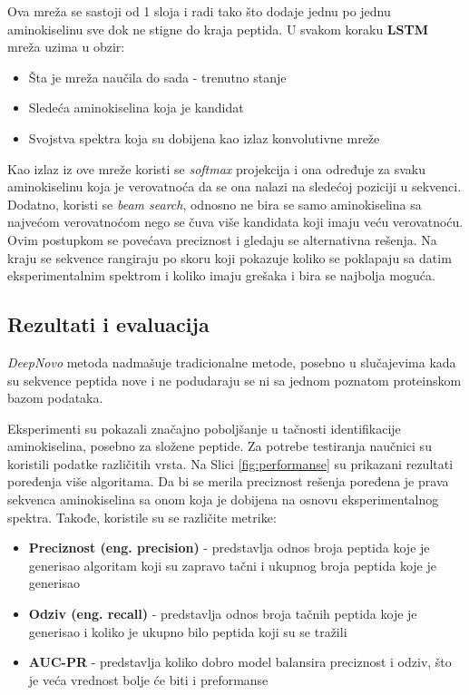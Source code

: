 \documentclass[12pt,oneside]{memoir}
\begin{document}
Ova mreža se sastoji od 1 sloja i radi tako što dodaje jednu po jednu aminokiselinu sve dok ne stigne do kraja peptida. U svakom koraku \textbf{LSTM} mreža uzima u obzir:
\begin{itemize}
    \item Šta je mreža naučila do sada - trenutno stanje
    \item Sledeća aminokiselina koja je kandidat
    \item Svojstva spektra koja su dobijena kao izlaz konvolutivne mreže
\end{itemize}

Kao izlaz iz ove mreže koristi se \emph{softmax} projekcija i ona određuje za svaku aminokiselinu koja je verovatnoća da se ona nalazi na sledećoj poziciji u sekvenci. Dodatno, koristi se \emph{beam search}, odnosno ne bira se samo aminokiselina sa najvećom verovatnoćom nego se čuva više kandidata koji imaju veću verovatnoću. Ovim postupkom se povećava preciznost i gledaju se alternativna rešenja. Na kraju se sekvence rangiraju po skoru koji pokazuje koliko se poklapaju sa datim eksperimentalnim spektrom i koliko imaju grešaka i bira se najbolja moguća.

\subsection{Rezultati i evaluacija}

\emph{DeepNovo} metoda nadmašuje tradicionalne metode, posebno u slučajevima kada su sekvence peptida nove i ne podudaraju se ni sa jednom poznatom proteinskom bazom podataka.

Eksperimenti su pokazali značajno poboljšanje u tačnosti identifikacije aminokiselina, posebno za složene peptide. Za potrebe testiranja naučnici su koristili podatke različitih vrsta. Na Slici \ref{fig:performanse} su prikazani rezultati poređenja više algoritama. Da bi se merila preciznost rešenja poređena je prava sekvenca aminokiselina sa onom koja je dobijena na osnovu eksperimentalnog spektra. 
Takođe, koristile su se različite metrike:
\begin{itemize}
    \item \textbf{Preciznost (eng. precision)} - predstavlja odnos broja peptida koje je generisao algoritam koji su zapravo tačni i ukupnog broja peptida koje je generisao
    \item \textbf{Odziv (eng. recall)} - predstavlja  odnos broja tačnih peptida koje je generisao i koliko je ukupno bilo peptida koji su se tražili
    \item \textbf{AUC-PR} - predstavlja koliko dobro model balansira preciznost i odziv, što je veća vrednost bolje će biti i preformanse
\end{itemize}
\end{document}
